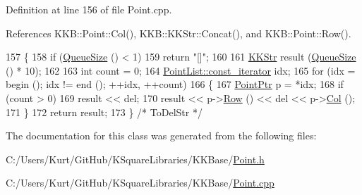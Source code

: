 Definition at line 156 of file Point.\+cpp.



References K\+K\+B\+::\+Point\+::\+Col(), K\+K\+B\+::\+K\+K\+Str\+::\+Concat(), and K\+K\+B\+::\+Point\+::\+Row().


\begin{DoxyCode}
157 \{
158   \textcolor{keywordflow}{if}  (\hyperlink{class_k_k_b_1_1_k_k_queue_a1dab601f75ee6a65d97f02bddf71c40d}{QueueSize} () < 1)
159     \textcolor{keywordflow}{return} \textcolor{stringliteral}{"[]"};
160 
161   \hyperlink{class_k_k_b_1_1_k_k_str}{KKStr}  result (\hyperlink{class_k_k_b_1_1_k_k_queue_a1dab601f75ee6a65d97f02bddf71c40d}{QueueSize} () * 10);
162 
163   \textcolor{keywordtype}{int}  count = 0;
164   \hyperlink{class_k_k_b_1_1_k_k_queue_aeb057c9c010446f46f57c1e355f981f1}{PointList::const\_iterator}  idx;
165   \textcolor{keywordflow}{for}  (idx = begin ();  idx != end ();  ++idx, ++count)
166   \{
167     \hyperlink{class_k_k_b_1_1_point}{PointPtr}  p = *idx;
168     \textcolor{keywordflow}{if}  (count > 0)
169       result << del;
170     result << p->\hyperlink{class_k_k_b_1_1_point_abfc34bcf809fc9fb95baf5c745b07549}{Row} () << del << p->\hyperlink{class_k_k_b_1_1_point_afb196b03757fc697f6ade0129a1c7fcf}{Col} ();
171   \}
172   \textcolor{keywordflow}{return}  result;
173 \}  \textcolor{comment}{/* ToDelStr */}
\end{DoxyCode}


The documentation for this class was generated from the following files\+:\begin{DoxyCompactItemize}
\item 
C\+:/\+Users/\+Kurt/\+Git\+Hub/\+K\+Square\+Libraries/\+K\+K\+Base/\hyperlink{_point_8h}{Point.\+h}\item 
C\+:/\+Users/\+Kurt/\+Git\+Hub/\+K\+Square\+Libraries/\+K\+K\+Base/\hyperlink{_point_8cpp}{Point.\+cpp}\end{DoxyCompactItemize}
